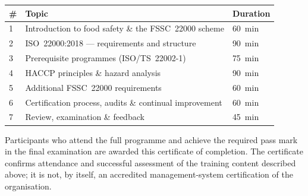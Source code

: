 \renewcommand{\arraystretch}{1.15}
\begin{tabular}{@{}p{0.9cm}p{9.4cm}p{1.9cm}@{}}
  \textbf{\#} & \textbf{Topic} & \textbf{Duration} \\[2pt]
  \hline
  1 & Introduction to food safety \& the FSSC~22000 scheme      & 60~min \\
  2 & ISO~22000:2018 — requirements and structure               & 90~min \\
  3 & Prerequisite programmes (ISO/TS~22002-1)                   & 75~min \\
  4 & HACCP principles \& hazard analysis                       & 90~min \\
  5 & Additional FSSC~22000 requirements                        & 60~min \\
  6 & Certification process, audits \& continual improvement     & 60~min \\
  7 & Review, examination \& feedback                            & 45~min \\
\end{tabular}

Participants who attend the full programme and achieve the required pass mark
in the final examination are awarded this certificate of completion. The
certificate confirms attendance and successful assessment of the training
content described above; it is not, by itself, an accredited management-system
certification of the organisation.
